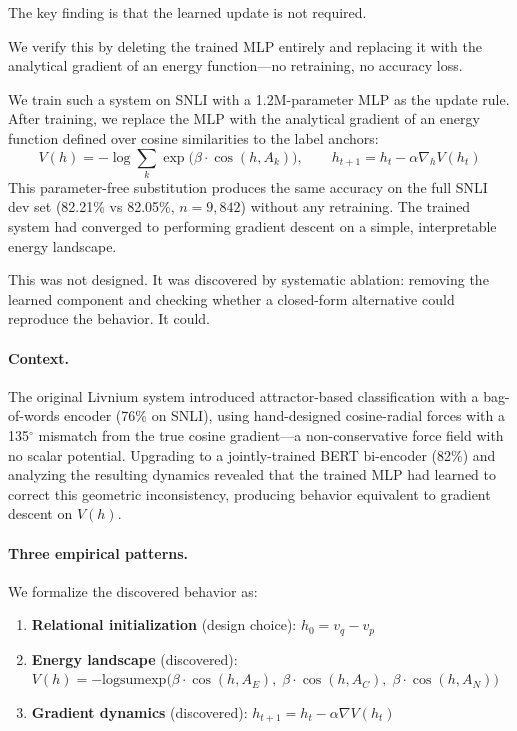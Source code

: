 \documentclass[11pt]{article}
\newcommand{\anchor}[1]{A_{#1}}
\newcommand{\lse}{\mathrm{logsumexp}}
\begin{document}
The key finding is that the learned update is not required.

We verify this by deleting the trained MLP entirely and replacing it
with the analytical gradient of an energy function---no retraining,
no accuracy loss.

We train such a system on SNLI with a 1.2M-parameter MLP as the update
rule. After training, we replace the MLP with the analytical gradient of
an energy function defined over cosine similarities to the label anchors:
\[
    V(h) = -\log\!\sum_{k} \exp\!\big(\beta \cdot \cos(h, \anchor{k})\big),
    \qquad h_{t+1} = h_t - \alpha \nabla_h V(h_t)
\]
This parameter-free substitution produces the same accuracy on the full
SNLI dev set (82.21\% vs 82.05\%, $n=9{,}842$) without any retraining.
The trained system had converged to performing gradient descent on a
simple, interpretable energy landscape.

This was not designed. It was discovered by systematic ablation: removing
the learned component and checking whether a closed-form alternative
could reproduce the behavior. It could.

\paragraph{Context.} The original Livnium system \citep{patil2026livnium}
introduced attractor-based classification with a bag-of-words encoder
(76\% on SNLI), using hand-designed cosine-radial forces with a
135$^{\circ}$ mismatch from the true cosine gradient---a non-conservative
force field with no scalar potential. Upgrading to a jointly-trained BERT
bi-encoder (82\%) and analyzing the resulting dynamics revealed that the
trained MLP had learned to correct this geometric inconsistency, producing
behavior equivalent to gradient descent on $V(h)$.

\paragraph{Three empirical patterns.} We formalize the discovered behavior as:
\begin{enumerate}
    \item \textbf{Relational initialization} (design choice): $h_0 = v_q - v_p$
    \item \textbf{Energy landscape} (discovered): $V(h) = -\lse\big(\beta \cdot \cos(h, \anchor{E}),\; \beta \cdot \cos(h, \anchor{C}),\; \beta \cdot \cos(h, \anchor{N})\big)$
    \item \textbf{Gradient dynamics} (discovered): $h_{t+1} = h_t - \alpha \nabla V(h_t)$
\end{enumerate}
\end{document}
